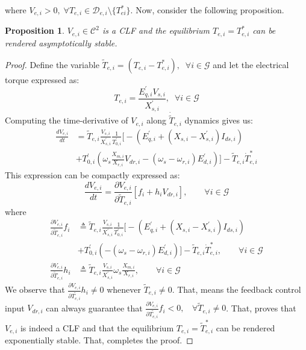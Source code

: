 \documentclass[letterpaper, 10 pt, conference]{ieeeconf}
\newtheorem{proposition}{\textnormal{\textbf{Proposition}}}
\begin{document}
where $V_{e,i}>0,\;\forall T_{e,i}\in \mathcal{D}_{e,i}\setminus\{T_{ei}^{*}\} $.
Now, consider the following proposition.
\begin{proposition}
$V_{e,i}\in \mathcal{C}^2$ is a \textit{CLF} and the equilibrium $T_{e,i}=T_{e,i}^*$ can be rendered \textit{asymptotically stable}.
\end{proposition}
\begin{proof}
Define the variable $\tilde{T}_{e,i}=(T_{e,i}-T_{e,i}^*),\;\;\forall i\in\mathcal{G}$ and let the electrical torque expressed as:
\begin{equation}
T_{e,i}=\frac{E_{q,i}^{'}V_{s,i}}{X_{s,i}^{'}},\;\;  \forall i\in\mathcal{G}
\label{Tei}
\end{equation}
 Computing the time-derivative of $V_{e,i}$ along $\dot{\tilde{T}}_{e,i}$ dynamics gives us:
\begin{align}
\frac{dV_{e,i}}{dt}&=\tilde{T}_{e,i} \frac{V_{s,i}}{X_{s,i}^'}\frac{1}{T_{0,i}^'}\Big[-(E_{q,i}^'+(X_{s,i}-X_{s,i}^')I_{ds,i})\nonumber\\&+T_{0,i}^'(\omega_s\frac{X_{m,i}}{X_{r,i}}V_{dr,i}-(\omega_s-\omega_{r,i})E_{d,i}^')\Big]-\tilde{T}_{e,i}\dot{T}_{e,i}^{*}
\end{align}
This expression can be compactly expressed as:
\begin{equation}
\frac{dV_{e,i}}{dt}=\frac{\partial V_{e,i}}{\partial\tilde{T}_{e,i}} [f_i+h_iV_{dr,i}],\qquad \forall i\in\mathcal{G}
\end{equation}
where 
\begin{align}
\frac{\partial V_{e,i}}{\partial\tilde{T}_{e,i}} f_i&\triangleq\tilde{T}_{e,i} \frac{V_{s,i}}{X_{s,i}^'}\frac{1}{T_{0,i}^'}\Big[-(E_{q,i}^'+(X_{s,i}-X_{s,i}^')I_{ds,i})\nonumber\\&+T_{0,i}^'(-(\omega_s-\omega_{r,i})E_{d,i}^')\Big]-\tilde{T}_{e,i}\dot{T}_{e,i}^{*},\qquad \forall i\in\mathcal{G}\\
\frac{\partial V_{e,i}}{\partial\tilde{T}_{e,i}}h_{i}&\triangleq\tilde{T}_{e,i} \frac{V_{s,i}}{X_{s,i}^'}\omega_s\frac{X_{m,i}}{X_{r,i}},\qquad \forall i\in\mathcal{G}
\end{align}
We observe that $\frac{\partial V_{e,i}}{\partial\tilde{T_{e,i}}}h_i\neq 0$ whenever $\tilde{T}_{e,i}\neq 0$. That, means the feedback control input $V_{dr,i}$ can always guarantee that $\frac{\partial V_{e,i}}{\partial\tilde{T_{e,i}}}f_i< 0,\;\;$  $\forall\tilde{T}_{e,i}\neq 0$. That, proves that $V_{e,i}$ is indeed a CLF and that the equilibrium $T_{e,i}=\tilde{T}_{e,i}^{*}$ can be rendered exponentially stable. That, completes the proof.\end{proof}
\end{document}
